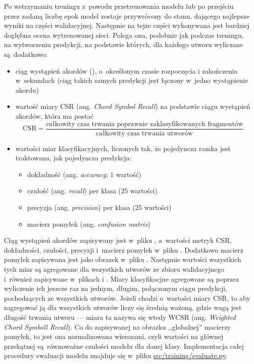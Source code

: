 Po wstrzymaniu treningu z~powodu przetrenowania modelu lub po przejściu przez zadaną liczbę epok model zostaje przywrócony do stanu, dającego najlepsze wyniki na części walidacyjnej. Następnie na tejże części wykonywana jest bardziej dogłębna ocena wytrenowanej sieci. Polega ona, podobnie jak podczas treningu, na wytworzeniu predykcji, na podstawie których, dla każdego utworu wyliczane są dodatkowo: 
\begin{itemize}
    \item ciąg wystąpień akordów (), o~określonym czasie rozpoczęcia i
        zakończenia w~sekundach (ciąg takich samych predykcji jest łączony w~jedno wystąpienie
        akordu)
    \item wartość miary CSR (ang. \emph{Chord Symbol Recall}) na podstawie
        ciągu wystąpień akordów, która ma postać
        \begin{displaymath}
            \textrm{CSR} = \frac
                        {\textrm{całkowity czas trwania poprawnie zaklasyfikowanych fragmentów}}
                        {\textrm{całkowity czas trwania utworów}}
        \end{displaymath}
    \item wartości miar klasyfikacyjnych, liczonych tak, że pojedyncza ramka jest traktowana, jak
        pojedyncza predykcja:
        \begin{itemize}
            \item dokładność (ang. \emph{accuracy}; $1$ wartość)
            \item czułość (ang. \emph{recall}) per klasa ($25$ wartości)
            \item precyzja (ang. \emph{precision}) per klasa ($25$ wartości)
            \item macierz pomyłek (ang. \emph{confusion matrix})
        \end{itemize}
\end{itemize}
Ciąg wystąpień akordów zapisywany jest w~pliku , a~wartości metryk CSR, dokładności, czułości, precyzji i~macierz pomyłek w~pliku . Dodatkowo macierz pomyłek zapisywana jest jako obrazek w~pliku . Następnie wartości wszystkich tych miar są agregowane dla wszystkich utworów ze zbioru walidacyjnego i~również zapisywane w~plikach  i . Miary klasyfikacjne agregowane są poprzez wyliczenie ich jeszcze raz na jednym, długim, połączonym ciągu predykcji, pochodzących ze wszystkich utworów. Jeżeli chodzi o~wartości miary CSR, to aby zagregować ją dla wszystkich utworów liczy się średnią ważoną, gdzie wagą jest długość trwania utworu --- miara ta nazywa się wtedy WCSR (ang. \emph{Weighted Chord Symboll Recall}). Co do zapisywanej na obrazku ,,globalnej'' macierzy pomyłek, to jest ona normalizowana wierszami, czyli wartości na głównej przekątnej są równoważne czułości modelu dla danej klasy. Implementacja całej procedury ewaluacji modelu znajduje się w~pliku \url{src/training/evaluate.py}.

